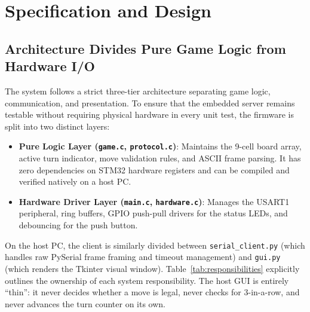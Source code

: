 \section{Specification and Design}
\label{sec:design}


\subsection{Architecture Divides Pure Game Logic from Hardware I/O}

The system follows a strict three-tier architecture separating game logic, communication, and presentation.
To ensure that the embedded server remains testable without requiring physical hardware in every unit test, the firmware is split into two distinct layers:
\begin{itemize}
    \item \textbf{Pure Logic Layer (\texttt{game.c}, \texttt{protocol.c})}: Maintains the 9-cell board array, active turn indicator, move validation rules, and ASCII frame parsing. It has zero dependencies on STM32 hardware registers and can be compiled and verified natively on a host PC.
    \item \textbf{Hardware Driver Layer (\texttt{main.c}, \texttt{hardware.c})}: Manages the USART1 peripheral, ring buffers, GPIO push-pull drivers for the status LEDs, and debouncing for the push button.
\end{itemize}

On the host PC, the client is similarly divided between \texttt{serial\_client.py} (which handles raw PySerial frame framing and timeout management) and \texttt{gui.py} (which renders the Tkinter visual window).
Table~\ref{tab:responsibilities} explicitly outlines the ownership of each system responsibility.
The host GUI is entirely ``thin'': it never decides whether a move is legal, never checks for 3-in-a-row, and never advances the turn counter on its own.

